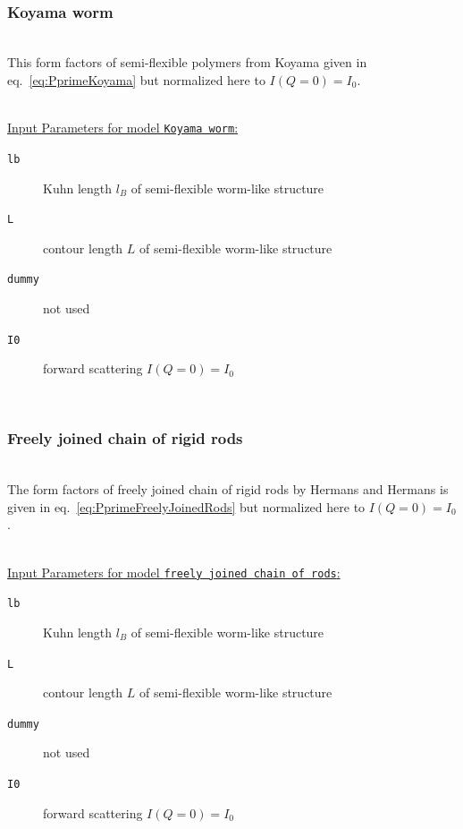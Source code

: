 \vphantom{.}~\\

\subsubsection{Koyama worm}
\label{sect:ffKoyamaWorm}
~\\
This form factors of semi-flexible polymers from Koyama \cite{Koyama1973,Koyama1974} given in eq.\ \ref{eq:PprimeKoyama} but normalized here to $I(Q=0)=I_0$.

\vspace{5mm}

\hspace{1pt}\\
\uline{Input Parameters for model \texttt{Koyama worm}:}\\
\begin{description}
\item[\texttt{lb}] Kuhn length $l_B$ of semi-flexible worm-like structure
\item[\texttt{L}] contour length $L$ of semi-flexible worm-like structure
\item[\texttt{dummy}] not used
\item[\texttt{I0}] forward scattering $I(Q=0)=I_0$
\end{description}

\vphantom{.}~\\

\subsubsection{Freely joined chain of rigid rods}
\label{sect:ffWormFreelyJoinedChainOfRods}
~\\
The form factors of freely joined chain of rigid rods by Hermans and Hermans \cite{Hermans1958} is given in eq.\ \ref{eq:PprimeFreelyJoinedRods} but normalized here to $I(Q=0)=I_0$.

\vspace{5mm}

\hspace{1pt}\\
\uline{Input Parameters for model \texttt{freely joined chain of rods}:}\\
\begin{description}
\item[\texttt{lb}] Kuhn length $l_B$ of semi-flexible worm-like structure
\item[\texttt{L}] contour length $L$ of semi-flexible worm-like structure
\item[\texttt{dummy}] not used
\item[\texttt{I0}] forward scattering $I(Q=0)=I_0$
\end{description}
